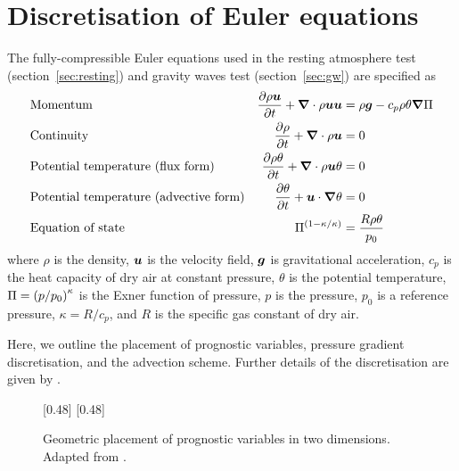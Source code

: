 \section{Discretisation of Euler equations}
\label{sec:method:discretisation}
The fully-compressible Euler equations used in the resting atmosphere test (section~\ref{sec:resting}) and gravity waves test (section~\ref{sec:gw}) are specified as
\begin{align}
& \text{Momentum} & \frac{\partial \rho \vect{u}}{\partial t} + \del \cdot \rho \vect{u} \vect{u} &= \rho \vect{g} - c_p \rho \theta \del \exner \\
%
& \text{Continuity} & \frac{\partial \rho}{\partial t} + \del \cdot \rho \vect{u} &= 0 \\
%
& \text{Potential temperature (flux form)} & \frac{\partial \rho \theta}{\partial t} + \del \cdot \rho \vect{u} \theta &= 0 \\
%
& \text{Potential temperature (advective form)} & \frac{\partial \theta}{\partial t} + \vect{u} \cdot \del \theta &= 0 \\
%
& \text{Equation of state} & \exner^{(1 - \kappa / \kappa)} &= \frac{R \rho \theta}{p_0}
\end{align}
where $\rho$ is the density, $\bm{u}$ is the velocity field, $\bm{g}$ is gravitational acceleration, $c_p$ is the heat capacity of dry air at constant pressure, $\theta$ is the potential temperature, $\Pi = \left( p / p_0 \right)^\kappa$ is the Exner function of pressure, $p$ is the pressure, $p_0$ is a reference pressure, $\kappa = R/c_p$, and $R$ is the specific gas constant of dry air.

Here, we outline the placement of prognostic variables, pressure gradient discretisation, and the advection scheme.  Further details of the discretisation are given by \textcite{weller-shahrokhi2014}.

\begin{figure}
	\captionsetup[subfigure]{position=b}
	\centering
	[0.48\textwidth]{}
	\hfill
	[0.48\textwidth]{}
	\caption{Geometric placement of prognostic variables in two dimensions.  Adapted from \textcite{weller-shahrokhi2014}.}
	\label{fig:method:placement}
\end{figure}



